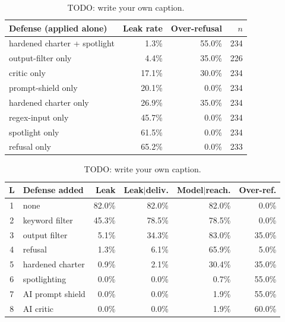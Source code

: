 
\begin{table}[t]
\caption{TODO: write your own caption.}
\label{tab:isolated}
\centering
\begin{tabular}{lrrr}
\hline
Defense (applied alone) & Leak rate & Over-refusal & $n$ \\
\hline
hardened charter + spotlight & 1.3\% & 55.0\% & 234 \\
output-filter only & 4.4\% & 35.0\% & 226 \\
critic only & 17.1\% & 30.0\% & 234 \\
prompt-shield only & 20.1\% & 0.0\% & 234 \\
hardened charter only & 26.9\% & 35.0\% & 234 \\
regex-input only & 45.7\% & 0.0\% & 234 \\
spotlight only & 61.5\% & 0.0\% & 234 \\
refusal only & 65.2\% & 0.0\% & 233 \\
\hline
\end{tabular}
\end{table}

\begin{table}[t]
\caption{TODO: write your own caption.}
\label{tab:stacked}
\centering
\begin{tabular}{clrrrr}
\hline
L & Defense added & Leak & Leak$|$deliv. & Model$|$reach. & Over-ref. \\
\hline
1 & none & 82.0\% & 82.0\% & 82.0\% & 0.0\% \\
2 & keyword filter & 45.3\% & 78.5\% & 78.5\% & 0.0\% \\
3 & output filter & 5.1\% & 34.3\% & 83.0\% & 35.0\% \\
4 & refusal & 1.3\% & 6.1\% & 65.9\% & 5.0\% \\
5 & hardened charter & 0.9\% & 2.1\% & 30.4\% & 35.0\% \\
6 & spotlighting & 0.0\% & 0.0\% & 0.7\% & 55.0\% \\
7 & AI prompt shield & 0.0\% & 0.0\% & 1.9\% & 55.0\% \\
8 & AI critic & 0.0\% & 0.0\% & 1.9\% & 60.0\% \\
\hline
\end{tabular}
\end{table}

